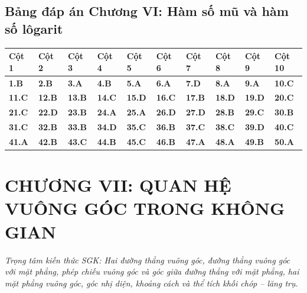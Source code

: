\documentclass[11pt,a4paper]{article}
\begin{document}
\subsection*{\color{primary} Bảng đáp án Chương VI: Hàm số mũ và hàm số lôgarit}
\begin{center}
\renewcommand{\arraystretch}{1.25}
\begin{tabularx}{\textwidth}{*{10}{>{\centering\arraybackslash}X}}
\toprule
\textbf{\color{primary} Cột 1} & \textbf{\color{primary} Cột 2} & \textbf{\color{primary} Cột 3} & \textbf{\color{primary} Cột 4} & \textbf{\color{primary} Cột 5} & \textbf{\color{primary} Cột 6} & \textbf{\color{primary} Cột 7} & \textbf{\color{primary} Cột 8} & \textbf{\color{primary} Cột 9} & \textbf{\color{primary} Cột 10} \\
\midrule
\textbf{1.B} & \textbf{2.B} & \textbf{3.A} & \textbf{4.B} & \textbf{5.A} & \textbf{6.A} & \textbf{7.D} & \textbf{8.A} & \textbf{9.A} & \textbf{10.C} \\
\rowcolor{rowtint} \textbf{11.C} & \textbf{12.B} & \textbf{13.B} & \textbf{14.C} & \textbf{15.D} & \textbf{16.C} & \textbf{17.B} & \textbf{18.D} & \textbf{19.D} & \textbf{20.C} \\
\textbf{21.C} & \textbf{22.D} & \textbf{23.B} & \textbf{24.A} & \textbf{25.A} & \textbf{26.D} & \textbf{27.D} & \textbf{28.B} & \textbf{29.C} & \textbf{30.B} \\
\rowcolor{rowtint} \textbf{31.C} & \textbf{32.B} & \textbf{33.B} & \textbf{34.D} & \textbf{35.C} & \textbf{36.B} & \textbf{37.C} & \textbf{38.C} & \textbf{39.D} & \textbf{40.C} \\
\textbf{41.A} & \textbf{42.B} & \textbf{43.C} & \textbf{44.B} & \textbf{45.C} & \textbf{46.B} & \textbf{47.A} & \textbf{48.A} & \textbf{49.B} & \textbf{50.A} \\
\bottomrule
\end{tabularx}
\end{center}\vspace{10pt}
\section*{\color{primary} CHƯƠNG VII: QUAN HỆ VUÔNG GÓC TRONG KHÔNG GIAN}
\textit{Trọng tâm kiến thức SGK: Hai đường thẳng vuông góc, đường thẳng vuông góc với mặt phẳng, phép chiếu vuông góc và góc giữa đường thẳng với mặt phẳng, hai mặt phẳng vuông góc, góc nhị diện, khoảng cách và thể tích khối chóp – lăng trụ.}\par\vspace{4pt}
\end{document}
